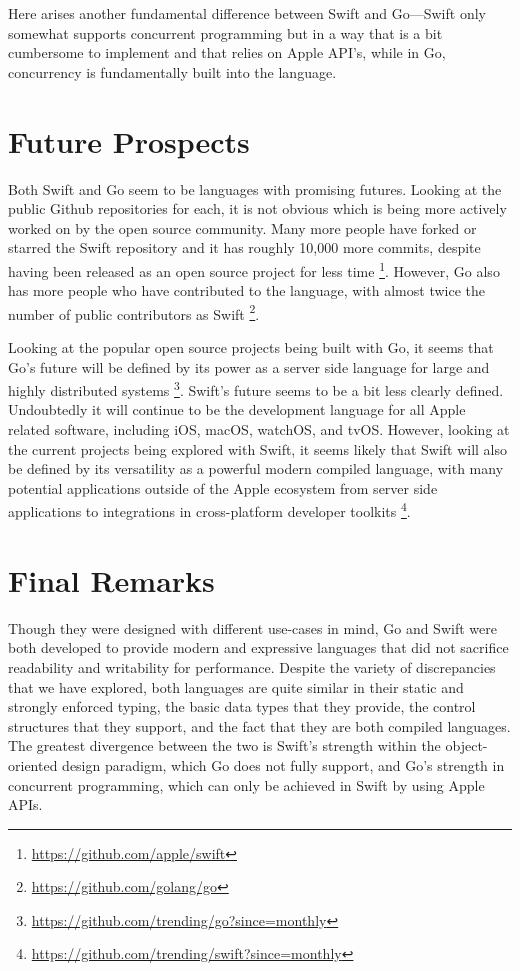 \documentclass[letterpaper]{article}
\begin{document}
Here arises another fundamental difference between Swift and Go—Swift only somewhat supports concurrent programming but in a way that is a bit cumbersome to implement and that relies on Apple API's, while in Go, concurrency is fundamentally built into the language.

\section{Future Prospects}

Both Swift and Go seem to be languages with promising futures. Looking at the public Github repositories for each, it is not obvious which is being more actively worked on by the open source community. Many more people have forked or starred the Swift repository and it has roughly 10,000 more commits, despite having been released as an open source project for less time \footnote{\url{https://github.com/apple/swift}}. However, Go also has more people who have contributed to the language, with almost twice the number of public contributors as Swift \footnote{\url{https://github.com/golang/go}}.

Looking at the popular open source projects being built with Go, it seems that Go’s future will be defined by its power as a server side language for large and highly distributed systems \footnote{\url{https://github.com/trending/go?since=monthly}}. Swift’s future seems to be a bit less clearly defined. Undoubtedly it will continue to be the development language for all Apple related software, including iOS, macOS, watchOS, and tvOS. However, looking at the current projects being explored with Swift, it seems likely that Swift will also be defined by its versatility as a powerful modern compiled language, with many potential applications outside of the Apple ecosystem from server side applications to integrations in cross-platform developer toolkits \footnote{\url{https://github.com/trending/swift?since=monthly}}.

\section{Final Remarks}

Though they were designed with different use-cases in mind, Go and Swift were both developed to provide modern and expressive languages that did not sacrifice readability and writability for performance. Despite the variety of discrepancies that we have explored, both languages are quite similar in their static and strongly enforced typing, the basic data types that they provide, the control structures that they support, and the fact that they are both compiled languages. The greatest divergence between the two is Swift's strength within the object-oriented design paradigm, which Go does not fully support, and Go's strength in concurrent programming, which can only be achieved in Swift by using Apple APIs.
\end{document}
